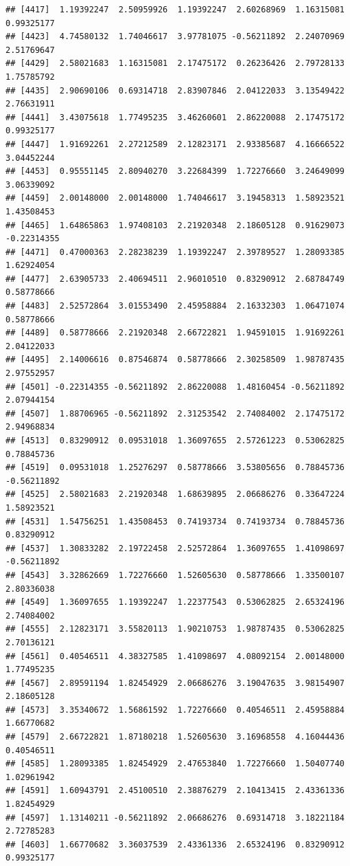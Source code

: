 \documentclass[
]{article}
\begin{document}
\begin{verbatim}
## [4417]  1.19392247  2.50959926  1.19392247  2.60268969  1.16315081  0.99325177
## [4423]  4.74580132  1.74046617  3.97781075 -0.56211892  2.24070969  2.51769647
## [4429]  2.58021683  1.16315081  2.17475172  0.26236426  2.79728133  1.75785792
## [4435]  2.90690106  0.69314718  2.83907846  2.04122033  3.13549422  2.76631911
## [4441]  3.43075618  1.77495235  3.46260601  2.86220088  2.17475172  0.99325177
## [4447]  1.91692261  2.27212589  2.12823171  2.93385687  4.16666522  3.04452244
## [4453]  0.95551145  2.80940270  3.22684399  1.72276660  3.24649099  3.06339092
## [4459]  2.00148000  2.00148000  1.74046617  3.19458313  1.58923521  1.43508453
## [4465]  1.64865863  1.97408103  2.21920348  2.18605128  0.91629073 -0.22314355
## [4471]  0.47000363  2.28238239  1.19392247  2.39789527  1.28093385  1.62924054
## [4477]  2.63905733  2.40694511  2.96010510  0.83290912  2.68784749  0.58778666
## [4483]  2.52572864  3.01553490  2.45958884  2.16332303  1.06471074  0.58778666
## [4489]  0.58778666  2.21920348  2.66722821  1.94591015  1.91692261  2.04122033
## [4495]  2.14006616  0.87546874  0.58778666  2.30258509  1.98787435  2.97552957
## [4501] -0.22314355 -0.56211892  2.86220088  1.48160454 -0.56211892  2.07944154
## [4507]  1.88706965 -0.56211892  2.31253542  2.74084002  2.17475172  2.94968834
## [4513]  0.83290912  0.09531018  1.36097655  2.57261223  0.53062825  0.78845736
## [4519]  0.09531018  1.25276297  0.58778666  3.53805656  0.78845736 -0.56211892
## [4525]  2.58021683  2.21920348  1.68639895  2.06686276  0.33647224  1.58923521
## [4531]  1.54756251  1.43508453  0.74193734  0.74193734  0.78845736  0.83290912
## [4537]  1.30833282  2.19722458  2.52572864  1.36097655  1.41098697 -0.56211892
## [4543]  3.32862669  1.72276660  1.52605630  0.58778666  1.33500107  2.80336038
## [4549]  1.36097655  1.19392247  1.22377543  0.53062825  2.65324196  2.74084002
## [4555]  2.12823171  3.55820113  1.90210753  1.98787435  0.53062825  2.70136121
## [4561]  0.40546511  4.38327585  1.41098697  4.08092154  2.00148000  1.77495235
## [4567]  2.89591194  1.82454929  2.06686276  3.19047635  3.98154907  2.18605128
## [4573]  3.35340672  1.56861592  1.72276660  0.40546511  2.45958884  1.66770682
## [4579]  2.66722821  1.87180218  1.52605630  3.16968558  4.16044436  0.40546511
## [4585]  1.28093385  1.82454929  2.47653840  1.72276660  1.50407740  1.02961942
## [4591]  1.60943791  2.45100510  2.38876279  2.10413415  2.43361336  1.82454929
## [4597]  1.13140211 -0.56211892  2.06686276  0.69314718  3.18221184  2.72785283
## [4603]  1.66770682  3.36037539  2.43361336  2.65324196  0.83290912  0.99325177

\end{verbatim}
\end{document}
